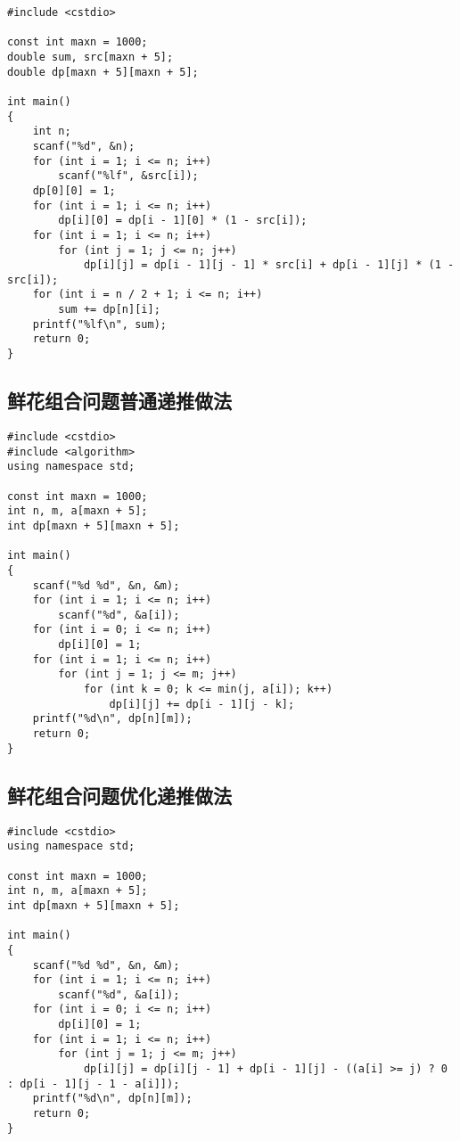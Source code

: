 \documentclass{article}
\begin{document}
\begin{lstlisting}
#include <cstdio>

const int maxn = 1000;
double sum, src[maxn + 5];
double dp[maxn + 5][maxn + 5];

int main()
{
    int n;
    scanf("%d", &n);
    for (int i = 1; i <= n; i++)
        scanf("%lf", &src[i]);
    dp[0][0] = 1;
    for (int i = 1; i <= n; i++)
        dp[i][0] = dp[i - 1][0] * (1 - src[i]);
    for (int i = 1; i <= n; i++)
        for (int j = 1; j <= n; j++)
            dp[i][j] = dp[i - 1][j - 1] * src[i] + dp[i - 1][j] * (1 - src[i]);
    for (int i = n / 2 + 1; i <= n; i++)
        sum += dp[n][i];
    printf("%lf\n", sum);
    return 0;
}
\end{lstlisting}

\subsection{鲜花组合问题普通递推做法}

\begin{lstlisting}
#include <cstdio>
#include <algorithm>
using namespace std;

const int maxn = 1000;
int n, m, a[maxn + 5];
int dp[maxn + 5][maxn + 5];

int main()
{
    scanf("%d %d", &n, &m);
    for (int i = 1; i <= n; i++)
        scanf("%d", &a[i]);
    for (int i = 0; i <= n; i++)
        dp[i][0] = 1;
    for (int i = 1; i <= n; i++)
        for (int j = 1; j <= m; j++)
            for (int k = 0; k <= min(j, a[i]); k++)
                dp[i][j] += dp[i - 1][j - k];
    printf("%d\n", dp[n][m]);
    return 0;
}
\end{lstlisting}

\subsection{鲜花组合问题优化递推做法}

\begin{lstlisting}
#include <cstdio>
using namespace std;

const int maxn = 1000;
int n, m, a[maxn + 5];
int dp[maxn + 5][maxn + 5];

int main()
{
    scanf("%d %d", &n, &m);
    for (int i = 1; i <= n; i++)
        scanf("%d", &a[i]);
    for (int i = 0; i <= n; i++)
        dp[i][0] = 1;
    for (int i = 1; i <= n; i++)
        for (int j = 1; j <= m; j++)
            dp[i][j] = dp[i][j - 1] + dp[i - 1][j] - ((a[i] >= j) ? 0 : dp[i - 1][j - 1 - a[i]]);
    printf("%d\n", dp[n][m]);
    return 0;
}
\end{lstlisting}
\end{document}
